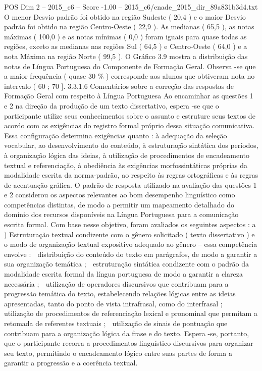 \begin{textsample}{POS Dim 2 – 2015\_c6 – Score -1.00 – 2015\_c6/enade\_2015\_dir\_89a831b3d4.txt}
O menor Desvio padrão foi obtido na região Sudeste ( 20,4 ) e o maior Desvio padrão foi obtido na região Centro-Oeste ( 22,9 ).
As medianas ( 65,5 ), as notas máximas ( 100,0 ) e as notas mínimas ( 0,0 ) foram iguais para quase todas as regiões, exceto as medianas nas regiões Sul ( 64,5 ) e Centro-Oeste ( 64,0 ) e a nota Máxima na região Norte ( 99,5 ).
O Gráfico 3.9 mostra a distribuição das notas de Língua Portuguesa do Componente de Formação Geral.
Observa -se que a maior frequência ( quase 30 \% ) corresponde aos alunos que obtiveram nota no intervalo ( 60 ; 70 ]. 3.3.1.6 Comentários sobre a correção das respostas de Formação Geral com respeito à Língua Portuguesa Ao encaminhar as questões 1 e 2 na direção da produção de um texto dissertativo, espera -se que o participante utilize seus conhecimentos sobre o assunto e estruture seus textos de acordo com as exigências do registro formal próprio dessa situação comunicativa.
Essa configuração determina exigências quanto : à adequação da seleção vocabular, ao desenvolvimento do conteúdo, à estruturação sintática dos períodos, à organização lógica das ideias, à utilização de procedimentos de encadeamento textual e referenciação, à obediência às exigências morfossintáticas próprias da modalidade escrita da norma-padrão, ao respeito às regras ortográficas e às regras de acentuação gráfica.
O padrão de resposta utilizado na avaliação das questões 1 e 2 considerou os aspectos relevantes ao bom desempenho linguístico como competências distintas, de modo a permitir um mapeamento detalhado do domínio dos recursos disponíveis na Língua Portuguesa para a comunicação escrita formal.
Com base nesse objetivo, foram avaliados os seguintes aspectos : a ) Estruturação textual condizente com o gênero solicitado ( texto dissertativo ) e o modo de organização textual expositivo adequado ao gênero – essa competência envolve :  distribuição do conteúdo do texto em parágrafos, de modo a garantir a sua organização temática ;  estruturação sintática condizente com o padrão da modalidade escrita formal da língua portuguesa de modo a garantir a clareza necessária ;  utilização de operadores discursivos que contribuam para a progressão temática do texto, estabelecendo relações lógicas entre as ideias apresentadas, tanto do ponto de vista intrafrasal, como do interfrasal ;  utilização de procedimentos de referenciação lexical e pronominal que permitam a retomada de referentes textuais ;  utilização de sinais de pontuação que contribuam para a organização lógica da frase e do texto.
Espera -se, portanto, que o participante recorra a procedimentos linguístico-discursivos para organizar seu texto, permitindo o encadeamento lógico entre suas partes de forma a garantir a progressão e a coerência textual.

\end{textsample}
